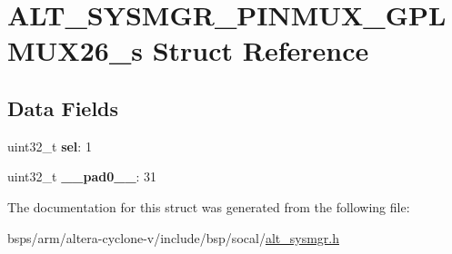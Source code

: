 \hypertarget{structALT__SYSMGR__PINMUX__GPLMUX26__s}{}\section{A\+L\+T\+\_\+\+S\+Y\+S\+M\+G\+R\+\_\+\+P\+I\+N\+M\+U\+X\+\_\+\+G\+P\+L\+M\+U\+X26\+\_\+s Struct Reference}
\label{structALT__SYSMGR__PINMUX__GPLMUX26__s}
\subsection*{Data Fields}
\begin{DoxyCompactItemize}
\item 
\mbox{\label{structALT__SYSMGR__PINMUX__GPLMUX26__s_abffb5b7dc42a3d43b0f2e93d365829bb}} 
uint32\+\_\+t {\bfseries sel}\+: 1
\item 
\mbox{\label{structALT__SYSMGR__PINMUX__GPLMUX26__s_afe2b5ccd7d8205f0d8dbceb0a8c6bf4e}} 
uint32\+\_\+t {\bfseries \+\_\+\+\_\+pad0\+\_\+\+\_\+}\+: 31
\end{DoxyCompactItemize}


The documentation for this struct was generated from the following file\+:\begin{DoxyCompactItemize}
\item 
bsps/arm/altera-\/cyclone-\/v/include/bsp/socal/\mbox{\hyperlink{alt__sysmgr_8h}{alt\+\_\+sysmgr.\+h}}\end{DoxyCompactItemize}
